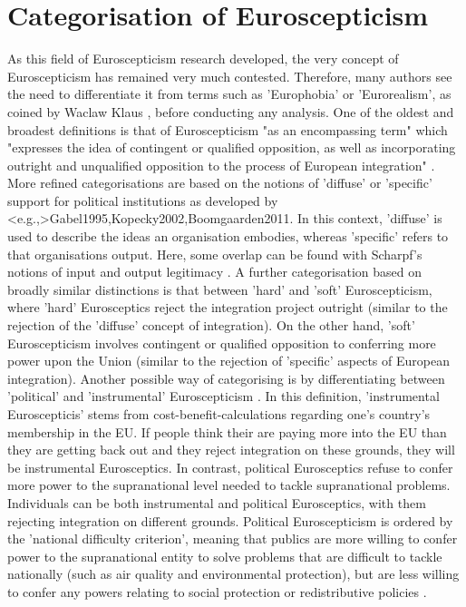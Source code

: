 \section{Categorisation of Euroscepticism}
As this field of Euroscepticism research developed, the very concept of Euroscepticism has remained very much contested. Therefore, many authors see the need to differentiate it from terms such as 'Europhobia' or 'Eurorealism', as coined by Waclaw Klaus \cite{Kopecky2002}, before conducting any analysis. One of the oldest and broadest definitions is that of Euroscepticism "as an encompassing term" which "expresses the idea of contingent or qualified opposition, as well as incorporating outright and unqualified opposition to the process of European integration" \cite[p.~366]{Taggart1998}. More refined categorisations are based on the notions of 'diffuse' or 'specific' support for political institutions as developed by  \shortcite<e.g.,>{Gabel1995,Kopecky2002,Boomgaarden2011}. In this context, 'diffuse' is used to describe the ideas an organisation embodies, whereas 'specific' refers to that organisations output. Here, some overlap can be found with Scharpf's notions of input and output legitimacy \cite{Boomgaarden2011}. A further categorisation based on broadly similar distinctions is that between 'hard' and 'soft' Euroscepticism, where 'hard' Eurosceptics reject the integration project outright (similar to the rejection of the 'diffuse' concept of integration). On the other hand, 'soft' Euroscepticism involves contingent or qualified opposition to conferring more power upon the Union \cite{Taggart2004} (similar to the rejection of 'specific' aspects of European integration). Another possible way of categorising is by differentiating between 'political' and 'instrumental' Euroscepticism \cite{Lubbers2005}. In this definition, 'instrumental Euroscepticis' stems from cost-benefit-calculations regarding one's country's membership in the EU. If people think their are paying more into the EU than they are getting back out and they reject integration on these grounds, they will be instrumental Eurosceptics. In contrast, political Eurosceptics refuse to confer more power to the supranational level needed to tackle supranational problems. Individuals can be both instrumental and political Eurosceptics, with them rejecting integration on different grounds. Political Euroscepticism is ordered by the 'national difficulty criterion', meaning that publics are more willing to confer power to the supranational entity to solve problems that are difficult to tackle nationally (such as air quality and environmental protection), but are less willing to confer any powers relating to social protection or redistributive policies \cite{Lubbers2005}.

